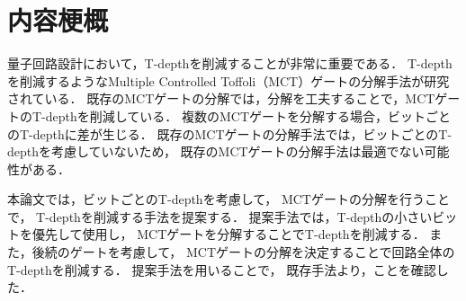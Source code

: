\chapter*{内容梗概}
量子回路設計において，T-depthを削減することが非常に重要である．
T-depthを削減するようなMultiple Controlled Toffoli（MCT）ゲートの分解手法が研究されている．
既存のMCTゲートの分解では，分解を工夫することで，MCTゲートのT-depthを削減している．
複数のMCTゲートを分解する場合，ビットごとのT-depthに差が生じる．
既存のMCTゲートの分解手法では，ビットごとのT-depthを考慮していないため，
既存のMCTゲートの分解手法は最適でない可能性がある．
\par
本論文では，ビットごとのT-depthを考慮して，
MCTゲートの分解を行うことで，
T-depthを削減する手法を提案する．
提案手法では，T-depthの小さいビットを優先して使用し，
MCTゲートを分解することでT-depthを削減する．
また，後続のゲートを考慮して，
MCTゲートの分解を決定することで回路全体のT-depthを削減する．
提案手法を用いることで，
既存手法より，ことを確認した．
\begin{comment}
\begin{itemize}
\item 12/20 ver0 目次案作成
\item 12/23 ver1 第一章作成
\item 12/26 ver2 同期チェックの結果を反映:\rout{赤色で修正}
\item 12/27 一章，先生のコメントを反映：\gout{緑色で修正}
\item 12/28 chap2\_ver0:第二章作成
\item 12/30 chap2\_ver1:同期チェックを反映：\gout{緑色で修正}
\item 12/31 chap2\_ver2:先生のコメントを反映：\bout{青色で修正}
\item 1/5 chap3\_ver0:第三章作成
\item 1/7 chap3\_ver1:同期チェックを反映：\bout{青色で修正}
\item 1/13 chap3\_ver2:先生のコメントを反映：\mout{赤紫色で修正}
\item 1/14 chap3:先生のコメントを反映：\rout{赤色で修正}
\item 1/17 chap4\_ver0:第4章作成
\item 1/18 chap4\_ver1:同期チェックを反映：\rout{赤色で修正}
\item 1/21 chap4\_ver2:先生のコメントを反映：\bout{青色で修正・追加}
\item 1/22 chap5\_ver0:第5章作成
\item 1/22 chap5\_ver1:同期チェックを反映：\rout{赤色で修正}
\item 1/23 chap5:先生のコメントを反映：\bout{青色で修正}
\item 1/23 chap6\_ver0:第6章作成
\item 1/23 chap6\_ver1:同期チェックで特に指摘なし
\item 1/24 chap6:先生のコメントを反映：\rout{赤色で修正}
\end{itemize}
\end{comment}
